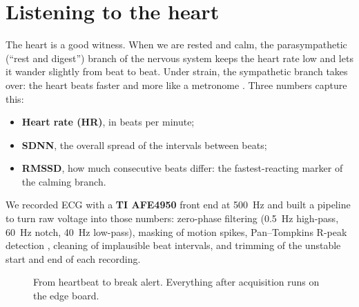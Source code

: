 \documentclass[11pt]{article}
\begin{document}
\section{Listening to the heart}

The heart is a good witness. When we are rested and calm, the parasympathetic (``rest and digest'') branch
of the nervous system keeps the heart rate low and lets it wander slightly from beat to beat. Under strain,
the sympathetic branch takes over: the heart beats faster and more like a metronome
\cite{taskforce1996,shaffer2017}. Three numbers capture this:

\begin{itemize}
  \item \textbf{Heart rate (HR)}, in beats per minute;
  \item \textbf{SDNN}, the overall spread of the intervals between beats;
  \item \textbf{RMSSD}, how much consecutive beats differ: the fastest-reacting marker of the calming branch.
\end{itemize}

We recorded ECG with a \textbf{TI AFE4950} front end at 500~Hz and built a pipeline to turn raw voltage into
those numbers: zero-phase filtering (0.5~Hz high-pass, 60~Hz notch, 40~Hz low-pass), masking of motion
spikes, Pan--Tompkins R-peak detection \cite{pantompkins1985}, cleaning of implausible beat intervals, and
trimming of the unstable start and end of each recording.

\begin{figure}[h]
\centering
{}
\caption{From heartbeat to break alert. Everything after acquisition runs on the edge board.}
\end{figure}
\end{document}

